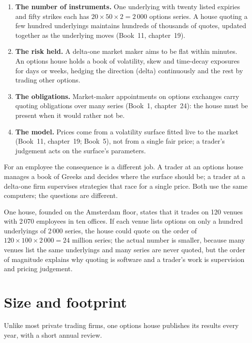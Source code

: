\begin{enumerate}
\item \textbf{The number of instruments.} One underlying with twenty listed expiries and fifty strikes each has
$20\times50\times2=2\,000$ options series. A house quoting a few hundred underlyings maintains hundreds of thousands of
quotes, updated together as the underlying moves (Book~11, chapter~19).
\item \textbf{The risk held.} A delta-one market maker aims to be flat within minutes. An options house holds a book of
volatility, skew and time-decay exposures for days or weeks, hedging the direction (delta) continuously and the rest
by trading other options.
\item \textbf{The obligations.} Market-maker appointments on options exchanges carry quoting obligations over many series
(Book~1, chapter~24): the house must be present when it would rather not be.
\item \textbf{The model.} Prices come from a volatility surface fitted live to the market (Book~11, chapter~19; Book~5),
not from a single fair price; a trader's judgement acts on the surface's parameters.
\end{enumerate}

For an employee the consequence is a different job. A trader at an options house manages a book of Greeks and decides
where the surface should be; a trader at a delta-one firm supervises strategies that race for a single price. Both
use the same computers; the questions are different.

\begin{example}\label{ex:in:the-options-market-making-houses:scale}
One house, founded on the Amsterdam floor, states that it trades on 120 venues with 2\,070 employees in ten offices.
If each venue lists options on only a hundred underlyings of 2\,000 series, the house could quote on the order of
$120\times100\times2\,000=24$ million series; the actual number is smaller, because many venues list the same
underlyings and many series are never quoted, but the order of magnitude explains why quoting is software and a
trader's work is supervision and pricing judgement.
\end{example}

\section{Size and footprint}

Unlike most private trading firms, one options house publishes its results every year, with a short annual review.

